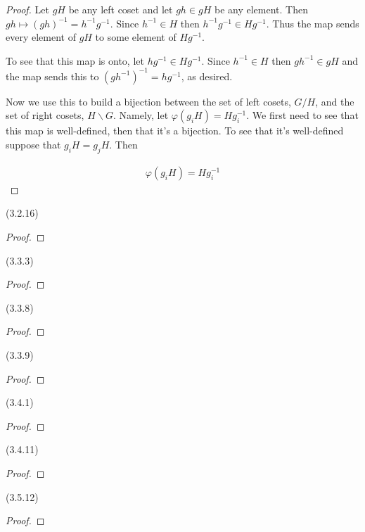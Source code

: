 \documentclass{exam}
\begin{document}
\begin{questions}
\begin{proof}
  Let $gH$ be any left coset and let $gh\in gH$ be any element.  Then $gh\mapsto (gh)^{-1} = h^{-1}g^{-1}$.  Since $h^{-1}\in H$ then $h^{-1}g^{-1}\in Hg^{-1}$.  Thus the map sends every element of $gH$ to some element of $Hg^{-1}$.

  To see that this map is onto, let $hg^{-1}\in Hg^{-1}$.  Since $h^{-1}\in H$ then $gh^{-1}\in gH$ and the map sends this to $(gh^{-1})^{-1}=hg^{-1}$, as desired.

  \vspace{1cm}

  Now we use this to build a bijection between the set of left cosets, $G/H$, and the set of right cosets, $H\backslash G$.  Namely, let $\varphi(g_iH)=Hg_i^{-1}$.  We first need to see that this map is well-defined, then that it's a bijection.  To see that it's well-defined suppose that $g_iH = g_jH$.  Then

  \begin{align*}
    \varphi(g_iH) = Hg_i^{-1}
  \end{align*}
\end{proof}

\question(3.2.16)\\

\begin{proof}
\end{proof}

\question(3.3.3)\\

\begin{proof}
\end{proof}

\question(3.3.8)\\

\begin{proof}
\end{proof}

\question(3.3.9)\\

\begin{proof}
\end{proof}

\question(3.4.1)\\

\begin{proof}
\end{proof}

\question(3.4.11)\\

\begin{proof}
\end{proof}

\question(3.5.12)\\

\begin{proof}
\end{proof}


\end{questions}
\end{document}

